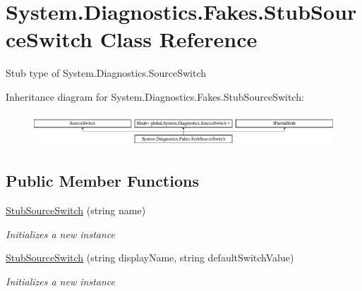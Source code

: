 \hypertarget{class_system_1_1_diagnostics_1_1_fakes_1_1_stub_source_switch}{\section{System.\-Diagnostics.\-Fakes.\-Stub\-Source\-Switch Class Reference}
\label{class_system_1_1_diagnostics_1_1_fakes_1_1_stub_source_switch}
}


Stub type of System.\-Diagnostics.\-Source\-Switch 


Inheritance diagram for System.\-Diagnostics.\-Fakes.\-Stub\-Source\-Switch\-:\begin{figure}[H]
\begin{center}
\leavevmode
\includegraphics[height=1.240310cm]{class_system_1_1_diagnostics_1_1_fakes_1_1_stub_source_switch}
\end{center}
\end{figure}
\subsection*{Public Member Functions}
\begin{DoxyCompactItemize}
\item 
\hyperlink{class_system_1_1_diagnostics_1_1_fakes_1_1_stub_source_switch_ad091f6f92150608c16dd7705c6ba7729}{Stub\-Source\-Switch} (string name)
\begin{DoxyCompactList}\small\item\em Initializes a new instance\end{DoxyCompactList}\item 
\hyperlink{class_system_1_1_diagnostics_1_1_fakes_1_1_stub_source_switch_a4d302823cacfd624657520f645568505}{Stub\-Source\-Switch} (string display\-Name, string default\-Switch\-Value)
\begin{DoxyCompactList}\small\item\em Initializes a new instance\end{DoxyCompactList}\end{DoxyCompactItemize}
